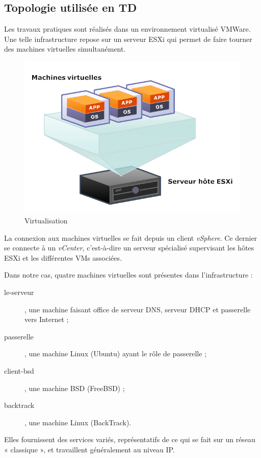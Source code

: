 \documentclass[a4paper]{article}
\begin{document}
\subsection{Topologie utilisée en TD}
Les travaux pratiques sont réalisés dans un environnement virtualisé VMWare.
Une telle infrastructure repose sur un serveur ESXi qui permet de faire tourner
des machines virtuelles simultanément. 

\begin{figure}[!ht]
	\centering
	\includegraphics[scale=.4]{ESX.PNG}
	\caption{\label{esx} Virtualisation}
\end{figure}

La connexion aux machines virtuelles se fait depuis un client \textit{vSphere}.
Ce dernier se connecte à un \textit{vCenter}, c'est-à-dire un serveur
spécialisé supervisant les hôtes ESXi et les différentes VMs associées.

Dans notre cas, quatre machines virtuelles sont présentes dans l'infrastructure :
\begin{description}
	\item[le-serveur], une machine faisant office de serveur DNS, serveur DHCP et
		passerelle vers Internet ;
	\item[passerelle], une machine Linux (Ubuntu) ayant le rôle de passerelle ;
	\item[client-bsd], une machine BSD (FreeBSD) ;
	\item[backtrack], une machine Linux (BackTrack).
\end{description}
Elles fournissent des services variés, représentatifs de ce qui se fait
sur un réseau « classique », et travaillent généralement au niveau IP.
\end{document}
